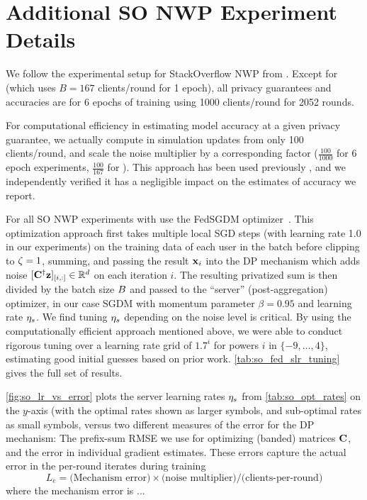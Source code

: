 \documentclass{article}
\begin{document}
\section{Additional SO NWP Experiment Details}\label{sec:sonwpdetail}

We follow the experimental setup for StackOverflow NWP from \citet{denisov22matfact,choquette2022multi}. Except for \semf (which uses $B=167$ clients/round for 1 epoch), all privacy guarantees and accuracies are for 6 epochs of training using 1000 clients/round for 2052 rounds.

For computational efficiency in estimating model accuracy at a given privacy guarantee, we actually compute in simulation updates from only 100 clients/round, and scale the noise multiplier by a corresponding factor ($\frac{100}{1000}$ for 6 epoch experiments, $\frac{100}{167}$ for \semf). This approach has been used previously \citep{dplangmodels,kairouz2021practical}, and we independently verified it has a negligible impact on the estimates of accuracy we report.

 For all SO NWP experiments with use the FedSGDM optimizer~\citep{reddi20adaptive}. This optimization approach first takes multiple local SGD steps (with learning rate 1.0 in our experiments) on the training data of each user in the batch before clipping to $\zeta=1$, summing, and passing the result $\mathbf{x}_i$ into the DP mechanism which adds noise $[\mathbf{C}^\dagger \mathbf{z}]_{[i, :]} \in \mathbb{R}^d$ on each iteration $i$. The resulting privatized sum is then divided by the batch size $B$ and passed to the ``server'' (post-aggregation) optimizer, in our case SGDM with momentum parameter $\beta=0.95$ and learning rate $\eta_s$.  We find tuning $\eta_s$ depending on the noise level is critical.  By using the computationally efficient approach mentioned above, we were able to conduct rigorous tuning over a learning rate grid of $1.7^i$ for powers $i$ in $\{-9, \dots, 4\}$, estimating good initial guesses based on prior work.  \cref{tab:so_fed_slr_tuning} gives the full set of results.


\newcommand{\efferr}{L_{e}}
\cref{fig:so_lr_vs_error} plots the server learning rates $\eta_s$ from \cref{tab:so_opt_rates} on the $y$-axis (with the optimal rates shown as larger symbols, and sub-optimal rates as small symbols, versus two different measures of the error for the DP mechanism: The prefix-sum RMSE we use for optimizing (banded) matrices $\mathbf{C}$, and the error in individual gradient estimates. These errors capture the actual error in the per-round iterates during training
\[
  L_{e} = \text{(Mechanism error)} \times \text{(noise multiplier)} / \text{(clients-per-round)}
\]
where the mechanism error is ... 
\end{document}
